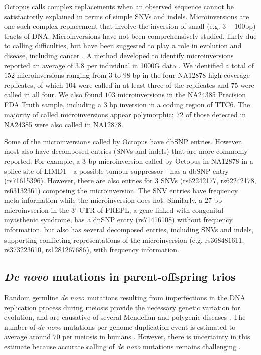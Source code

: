 \documentclass[notitlepage, twocolumn, 10pt]{article}
\begin{document}
Octopus calls complex replacements when an observed sequence cannot be satisfactorily explained in terms of simple SNVs and indels. Microinversions are one such complex replacement that involve the inversion of small (e.g. $3-100$bp) tracts of DNA. Microinversions have not been comprehensively studied, likely due to calling difficulties, but have been suggested to play a role in evolution \cite{RN561} and disease, including cancer \cite {RN560}. A method developed to identify microinversions reported an average of $3.8$ per individual in 1000G data \cite{RN560}. We identified a total of $152$ microinversions ranging from $3$ to $98$ bp in the four NA12878 high-coverage replicates, of which $104$ were called in at least three of the replicates and $75$ were called in all four. We also found $103$ microinversions in the NA24385 Precision FDA Truth sample, including a $3$ bp inversion in a coding region of TTC6. The majority of called microinversions appear polymorphic; $72$ of those detected in NA24385 were also called in NA12878.

Some of the microinversions called by Octopus have dbSNP entries. However, most also have decomposed entries (SNVs and indels) that are more commonly reported. For example, a $3$ bp microinversion called by Octopus in NA12878 in a splice site of LIMD1 - a possible tumour suppressor - has a dbSNP entry (rs71615396). However, there are also entries for $3$ SNVs (rs62242177, rs62242178, rs63132361) composing the microinversion. The SNV entries have frequency meta-information while the microinversion does not. Similarly, a $27$ bp microinvserion in the 3'-UTR of PREPL, a gene linked with congenital myasthenic syndrome, has a dnSNP entry (rs71416108) without frequency information, but also has several decomposed entries, including SNVs and indels, supporting conflicting representations of the microinversion (e.g. rs368481611, rs373223610, rs1281267686), with frequency information.

\subsection*{\textit{De novo} mutations in parent-offspring trios}

Random germline \textit{de novo} mutations resulting from imperfections in the DNA replication process during meiosis provide the necessary genetic variation for evolution, and are causative of several Mendelian and polygenic diseases \cite{RN157, RN160, RN159}. The number of \textit{de novo} mutations per genome duplication event is estimated to average around $70$ per meiosis in humans \cite{RN6}. However, there is uncertainty in this estimate because accurate calling of \textit{de novo} mutations remains challenging \cite{RN3, RN514, RN541, RN6, RN572}.
\end{document}
